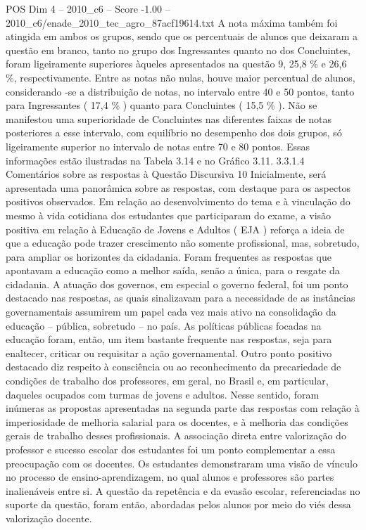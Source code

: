 \begin{textsample}{POS Dim 4 – 2010\_c6 – Score -1.00 – 2010\_c6/enade\_2010\_tec\_agro\_87acf19614.txt}
A nota máxima também foi atingida em ambos os grupos, sendo que os percentuais de alunos que deixaram a questão em branco, tanto no grupo dos Ingressantes quanto no dos Concluintes, foram ligeiramente superiores àqueles apresentados na questão 9, 25,8 \% e 26,6 \%, respectivamente.
Entre as notas não nulas, houve maior percentual de alunos, considerando -se a distribuição de notas, no intervalo entre 40 e 50 pontos, tanto para Ingressantes ( 17,4 \% ) quanto para Concluintes ( 15,5 \% ).
Não se manifestou uma superioridade de Concluintes nas diferentes faixas de notas posteriores a esse intervalo, com equilíbrio no desempenho dos dois grupos, só ligeiramente superior no intervalo de notas entre 70 e 80 pontos.
Essas informações estão ilustradas na Tabela 3.14 e no Gráfico 3.11. 3.3.1.4 Comentários sobre as respostas à Questão Discursiva 10 Inicialmente, será apresentada uma panorâmica sobre as respostas, com destaque para os aspectos positivos observados.
Em relação ao desenvolvimento do tema e à vinculação do mesmo à vida cotidiana dos estudantes que participaram do exame, a visão positiva em relação à Educação de Jovens e Adultos ( EJA ) reforça a ideia de que a educação pode trazer crescimento não somente profissional, mas, sobretudo, para ampliar os horizontes da cidadania.
Foram frequentes as respostas que apontavam a educação como a melhor saída, senão a única, para o resgate da cidadania.
A atuação dos governos, em especial o governo federal, foi um ponto destacado nas respostas, as quais sinalizavam para a necessidade de as instâncias governamentais assumirem um papel cada vez mais ativo na consolidação da educação – pública, sobretudo – no país.
As políticas públicas focadas na educação foram, então, um item bastante frequente nas respostas, seja para enaltecer, criticar ou requisitar a ação governamental.
Outro ponto positivo destacado diz respeito à consciência ou ao reconhecimento da precariedade de condições de trabalho dos professores, em geral, no Brasil e, em particular, daqueles ocupados com turmas de jovens e adultos.
Nesse sentido, foram inúmeras as propostas apresentadas na segunda parte das respostas com relação à imperiosidade de melhoria salarial para os docentes, e à melhoria das condições gerais de trabalho desses profissionais.
A associação direta entre valorização do professor e sucesso escolar dos estudantes foi um ponto complementar a essa preocupação com os docentes.
Os estudantes demonstraram uma visão de vínculo no processo de ensino-aprendizagem, no qual alunos e professores são partes inalienáveis entre si.
A questão da repetência e da evasão escolar, referenciadas no suporte da questão, foram então, abordadas pelos alunos por meio do viés dessa valorização docente.

\end{textsample}
